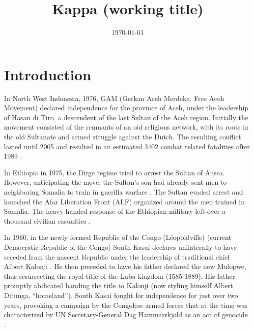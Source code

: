 \documentclass[12pt]{article}
\title{Kappa (working title)}
\author{}
\date{\today}
\begin{document}
\maketitle


\section{Introduction}

In North West Indonesia, 1976, GAM (Gerkan Aceh Merdeka: Free Aceh Movement)
declared independence for the province of Aceh, under the leadership of Hasan di
Tiro, a descendent of the last Sultan of the Aceh region. Initially the movement
consisted of the remnants of an old religious network, with its roots in the old
Sultanate and armed struggle against the Dutch. The resulting
conflict lasted until 2005 and resulted in an estimated 3402 combat related
fatalities after 1989 \citep{Aspinall2009, Pettersson2018, Sundberg2013}.

In Ethiopia in 1975, the Dirge regime tried to arrest the Sultan of Aussa. However,
anticipating the move, the Sultan's son had already sent men to neighboring
Somalia to train in guerilla warfare \citep{Shehim1985}. The Sultan evaded
arrest and launched the Afar Liberation Front (ALF) organized around the men
trained in Somalia. The heavy handed response of the Ethiopian military left
over a thousand civilian casualties \citep{UCDPconflict363}.

In 1960, in the newly formed Republic of the Congo (Léopoldville) (current
Democratic Republic of the Congo) South Kasai declares unilaterally to have
seceded from the nascent Republic under the leadership of traditional chief
Albert Kalonji \citep{Nzongola2002}. He then preceded to have his father
declared the new Mulopwe, thus resurrecting the royal title of the Luba kingdom
(1585-1889). His father promptly abdicated handing the title to Kalonji (now
styling himself Albert Ditunga, ``homeland''). South Kasai fought for independence
for just over two years, provoking a campaign by the Congolese armed forces that
at the time was characterized by UN Secretary-General Dag Hammarskjöld as an act
of genocide \citep{Nzongola2002}.
\end{document}
